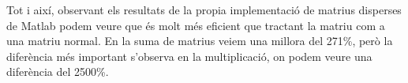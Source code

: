 \documentclass[11pt,a4paper,twoside]{report}
\begin{document}
Tot i així, observant els resultats de la propia implementació de matrius disperses de Matlab podem veure que és molt més eficient que tractant la matriu com a una matriu normal.
En la suma de matrius veiem una millora del 271\%, però la diferència més important s'observa en la multiplicació, on podem veure una diferència del 2500\%.



\end{document}
